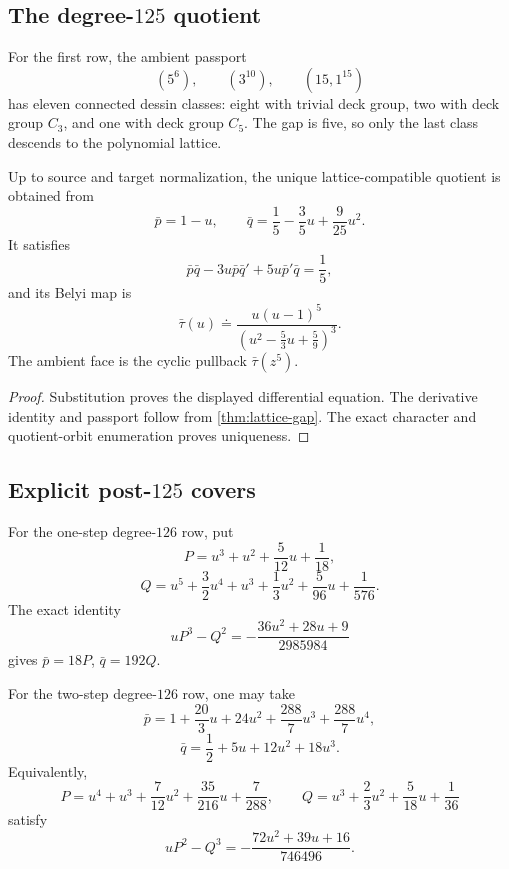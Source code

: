 \documentclass[11pt,reqno]{amsart}
\begin{document}
\subsection{The degree-\texorpdfstring{\(125\)}{125} quotient}

For the first row, the ambient passport
\[
(5^6),\qquad(3^{10}),\qquad(15,1^{15})
\]
has eleven connected dessin classes: eight with trivial deck group, two
with deck group \(C_3\), and one with deck group \(C_5\).  The gap is five,
so only the last class descends to the polynomial lattice.

\begin{proposition}
\label{prop:f2-map}
Up to source and target normalization, the unique lattice-compatible
quotient is obtained from
\[
\bar p=1-u,\qquad
\bar q=\frac15-\frac35u+\frac9{25}u^2.
\]
It satisfies
\[
\bar p\bar q-3u\bar p\bar q'+5u\bar p'\bar q=\frac15,
\]
and its Belyi map is
\begin{equation}
\label{eq:f2-map}
\bar\tau(u)\doteq
\frac{u(u-1)^5}
{\left(u^2-\frac53u+\frac59\right)^3}.
\end{equation}
The ambient face is the cyclic pullback \(\bar\tau(z^5)\).
\end{proposition}

\begin{proof}
Substitution proves the displayed differential equation.  The derivative
identity and passport follow from \cref{thm:lattice-gap}.  The exact
character and quotient-orbit enumeration proves uniqueness.
\end{proof}

\subsection{Explicit post-\texorpdfstring{\(125\)}{125} covers}

For the one-step degree-\(126\) row, put
\[
P=u^3+u^2+\frac5{12}u+\frac1{18},
\]
\[
Q=u^5+\frac32u^4+u^3+\frac13u^2+\frac5{96}u+\frac1{576}.
\]
The exact identity
\begin{equation}
\label{eq:126-one}
uP^3-Q^2=-\frac{36u^2+28u+9}{2985984}
\end{equation}
gives \(\bar p=18P\), \(\bar q=192Q\).

For the two-step degree-\(126\) row, one may take
\[
\bar p=1+\frac{20}{3}u+24u^2+\frac{288}{7}u^3+\frac{288}{7}u^4,
\]
\[
\bar q=\frac12+5u+12u^2+18u^3.
\]
Equivalently,
\[
P=u^4+u^3+\frac7{12}u^2+\frac{35}{216}u+\frac7{288},
\qquad
Q=u^3+\frac23u^2+\frac5{18}u+\frac1{36}
\]
satisfy
\begin{equation}
\label{eq:126-two}
uP^2-Q^3=-\frac{72u^2+39u+16}{746496}.
\end{equation}
\end{document}
